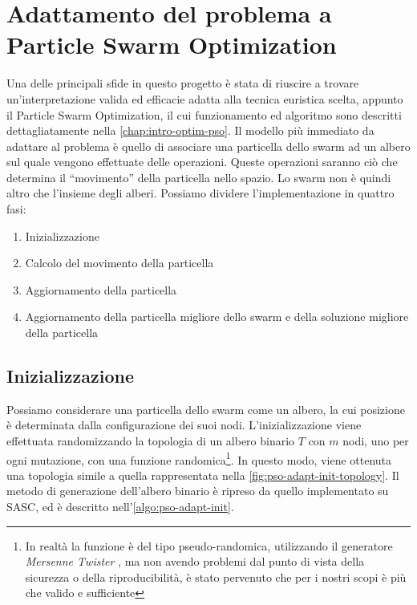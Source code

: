 \section{Adattamento del problema a Particle Swarm Optimization}
\label{chap:pso-adapt}
Una delle principali sfide in questo progetto è stata di riuscire a trovare un'interpretazione valida ed efficacie adatta alla tecnica euristica scelta, appunto il Particle Swarm Optimization, il cui funzionamento ed algoritmo sono descritti dettagliatamente nella \autoref{chap:intro-optim-pso}. Il modello più immediato da adattare al problema è quello di associare una particella dello swarm ad un albero sul quale vengono effettuate delle operazioni. Queste operazioni saranno ciò che determina il ``movimento'' della particella nello spazio. Lo swarm non è quindi altro che l'insieme degli alberi. Possiamo dividere l'implementazione in quattro fasi: \begin{enumerate}
  \item Inizializzazione
  \item Calcolo del movimento della particella
  \item Aggiornamento della particella
  \item Aggiornamento della particella migliore dello swarm e della soluzione migliore della particella
\end{enumerate}

\subsection{Inizializzazione}
\label{chap:pso-adapt-init}
Possiamo considerare una particella dello swarm come un albero, la cui posizione è determinata dalla configurazione dei suoi nodi. L'inizializzazione viene effettuata randomizzando la topologia di un albero binario $T$ con $m$ nodi, uno per ogni mutazione, con una funzione randomica\footnote{In realtà la funzione è del tipo pseudo-randomica, utilizzando il generatore \textit{Mersenne Twister} \cite{Matsumoto:MersenneTwister}, ma non avendo problemi dal punto di vista della sicurezza o della riproducibilità, è stato pervenuto che per i nostri scopi è più che valido e sufficiente}. In questo modo, viene ottenuta una topologia simile a quella rappresentata nella \autoref{fig:pso-adapt-init-topology}. Il metodo di generazione dell'albero binario è ripreso da quello implementato su SASC, ed è descritto nell'\autoref{algo:pso-adapt-init}.

